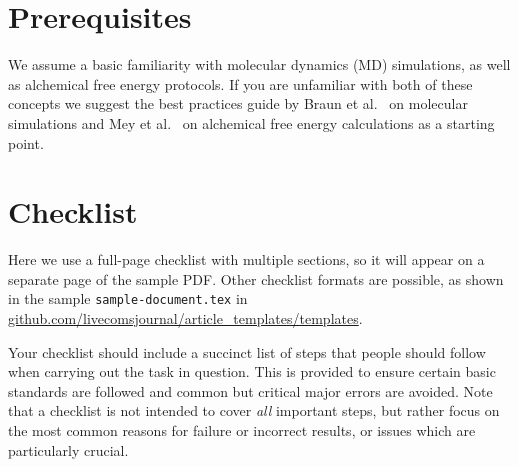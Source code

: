 \documentclass[9pt,bestpractices]{livecoms}
\begin{document}

\section{Prerequisites}
We assume a basic familiarity with molecular dynamics (MD) simulations, as well as alchemical free energy protocols. If you are unfamiliar with both of these concepts we suggest the best practices guide by Braun et al.~\cite{braunBestPracticesFoundations2019} on molecular simulations and Mey et al.~\cite{meyBestPracticesAlchemical2020} on alchemical free energy calculations as a starting point. 

\section{Checklist}
Here we use a full-page checklist with multiple sections, so it will appear on a separate page of the sample PDF.
Other checklist formats are possible, as shown in the sample \texttt{sample-document.tex} in \url{github.com/livecomsjournal/article_templates/templates}.

Your checklist should include a succinct list of steps that people should follow when carrying out the task in question.
This is provided to ensure certain basic standards are followed and common but critical major errors are avoided.
Note that a checklist is not intended to cover \emph{all} important steps, but rather focus on the most common reasons for failure or incorrect results, or issues which are particularly crucial.


\end{document}
